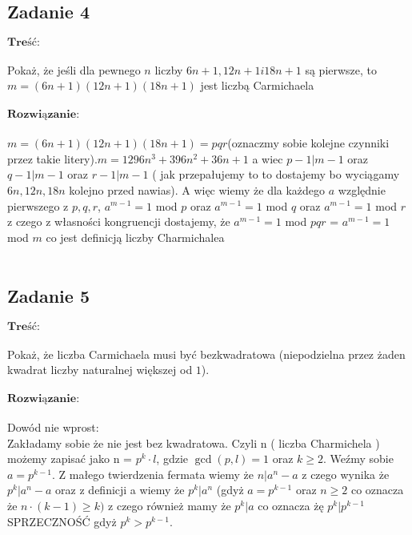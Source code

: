 \subsection{Zadanie 4}
$\textbf{Treść:}$  \\ \\
 Pokaż, że jeśli dla pewnego $n$ liczby $6n + 1, 12n + 1 i 18n + 1$ są pierwsze,
to $m = (6n + 1)(12n + 1)(18n + 1)$ jest liczbą Carmichaela
\\
\\
$\textbf{Rozwiązanie:}$ \\
\\
$m = (6n + 1)(12n + 1)(18n + 1) = pqr $(oznaczmy sobie kolejne czynniki przez takie litery).$m = 1296 n^3 + 396 n^2 + 36 n + 1$ a wiec $p-1 | m-1$ oraz $q-1 | m-1$ oraz $r-1 | m-1$ ( jak przepałujemy to to dostajemy bo wyciągamy $6n,12n,18n$ kolejno przed nawias). A więc wiemy że dla każdego $a$ względnie pierwszego z $p,q,r$, $a^{m-1} = 1$ mod $p$ oraz $a^{m-1} = 1$ mod $q$ oraz $a^{m-1} = 1$ mod $r$ z czego z własności kongruencji dostajemy, że $a^{m-1} = 1$ mod $pqr$ = $a^{m-1} = 1$ mod $m$ co jest definicją liczby Charmichalea
\\ \\


\subsection{Zadanie 5}
$\textbf{Treść:}$ \\ \\
Pokaż, że liczba Carmichaela musi być bezkwadratowa (niepodzielna przez
żaden kwadrat liczby naturalnej większej od $1$). \\ \\
$\textbf{Rozwiązanie:}$ \\
\\
Dowód nie wprost: \\
Zakładamy sobie że nie jest bez kwadratowa. Czyli n ( liczba Charmichela ) możemy zapisać jako n = $p^k \cdot l$, gdzie $\gcd(p,l) = 1$ oraz $k \ge 2$. Weźmy sobie $a = p^{k-1}$. Z małego twierdzenia fermata wiemy że $n | a^n - a$ z czego wynika że $p^k | a^n - a$ oraz z definicji a wiemy że $p^k | a^n$ (gdyż $a = p^{k-1}$ oraz $n \ge 2$ co oznacza że $n\cdot (k-1) \ge k )$ z czego również mamy że $p^k | a$ co oznacza żę $p^k | p^{k-1}$ SPRZECZNOŚĆ gdyż $p^k > p^{k-1}$.
